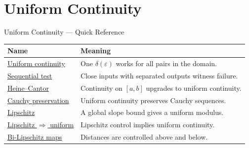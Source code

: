 
\section{Uniform Continuity}

\begin{toolkitbox}{Uniform Continuity --- Quick Reference}
\small
\begin{tabular}{l l}
\toprule
\textbf{Name} & \textbf{Meaning}\\
\midrule
\hyperref[def:uniform-continuity]{Uniform continuity} & One $\delta(\varepsilon)$ works for all pairs in the domain.\\
\hyperref[prop:sequential-uniform-continuity]{Sequential test} & Close inputs with separated outputs witness failure.\\
\hyperref[thm:heine-cantor]{Heine--Cantor} & Continuity on $[a,b]$ upgrades to uniform continuity.\\
\hyperref[prop:uniform-continuity-cauchy]{Cauchy preservation} & Uniform continuity preserves Cauchy sequences.\\
\hyperref[def:lipschitz-condition]{Lipschitz} & A global slope bound gives a uniform modulus.\\
\hyperref[prop:lipschitz-implies-uc]{Lipschitz $\Rightarrow$ uniform} & Lipschitz control implies uniform continuity.\\
\hyperref[def:bi-lipschitz]{Bi-Lipschitz maps} & Distances are controlled above and below.\\
\bottomrule
\end{tabular}
\end{toolkitbox}



